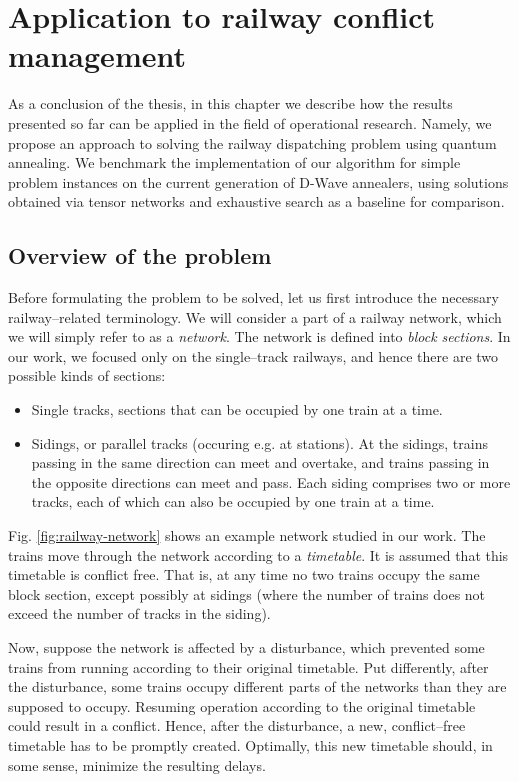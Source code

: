 \chapter{Application to railway conflict management}

As a conclusion of the thesis, in this chapter we describe how the results presented so far can be
applied in the field of operational research. Namely, we propose an approach to solving the railway
dispatching problem using quantum annealing. We benchmark the implementation of our algorithm for
simple problem instances on the current generation of D-Wave annealers, using solutions obtained via
tensor networks and exhaustive search as a baseline for comparison.


\section{Overview of the problem}
Before formulating the problem to be solved, let us first introduce the necessary railway--related
terminology. We will consider a part of a railway network, which we will simply refer to as a
\emph{network}. The network is defined into \emph{block sections}. In our work, we focused only on
the single--track railways, and hence there are two possible kinds of sections:
\begin{itemize}
    \item Single tracks, sections that can be occupied by one train at a time.
    \item Sidings, or parallel tracks (occuring e.g. at stations). At the sidings, trains passing in
      the same direction can meet and overtake, and trains passing in the opposite directions can
      meet and pass. Each siding comprises two or more tracks, each of which can also be occupied by
      one train at a time.
\end{itemize}

Fig. \ref{fig:railway-network} shows an example network studied in our work. The trains move through
the network according to a \emph{timetable}. It is assumed that this timetable is conflict free.
That is, at any time no two trains occupy the same block section, except possibly at sidings (where
the number of trains does not exceed the number of tracks in the siding).

Now, suppose the network is affected by a disturbance, which prevented some trains from running
according to their original timetable. Put differently, after the disturbance, some trains occupy
different parts of the networks than they are supposed to occupy. Resuming operation according to
the original timetable could result in a conflict. Hence, after the disturbance, a new,
conflict--free timetable has to be promptly created. Optimally, this new timetable should, in some
sense, minimize the resulting delays.

